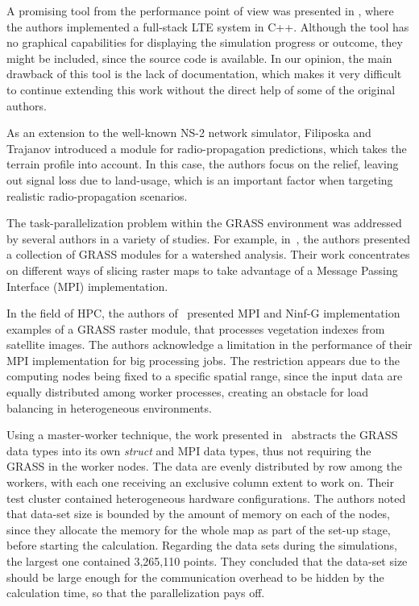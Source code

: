 A promising tool from the performance point of view was presented
in \cite{Piro_Simulating_LTE_cellular_systems_an_open_source_framework:2011},
where the authors implemented a full-stack LTE system in C++. Although
the tool has no graphical capabilities for displaying the simulation
progress or outcome, they might be included, since the source code
is available. In our opinion, the main drawback of this tool is the
lack of documentation, which makes it very difficult to continue extending
this work without the direct help of some of the original authors.

As an extension to the well-known NS-2 network simulator, Filiposka
and Trajanov \cite{Filiposka_Terrain_aware_three_dimensional_radio_propagation_model_extension_for_NS2:2011}
introduced a module for radio-propagation predictions, which takes
the terrain profile into account. In this case, the authors focus
on the relief, leaving out signal loss due to land-usage, which is
an important factor when targeting realistic radio-propagation scenarios.

\bigskip{}


The task-parallelization problem within the GRASS environment was
addressed by several authors in a variety of studies. For example,
in~\cite{Campos_Parallel_modelling_in_GIS:2012}, the authors presented
a collection of GRASS modules for a watershed analysis. Their work
concentrates on different ways of slicing raster maps to take advantage
of a Message Passing Interface (MPI) implementation.

In the field of HPC, the authors of~\cite{Akhter_Porting_GRASS_raster_module_to_distributed_computing:2007}
presented MPI and Ninf-G implementation examples of a GRASS raster
module, that processes vegetation indexes from satellite images. The
authors acknowledge a limitation in the performance of their MPI implementation
for big processing jobs. The restriction appears due to the computing
nodes being fixed to a specific spatial range, since the input data
are equally distributed among worker processes, creating an obstacle
for load balancing in heterogeneous environments.

Using a master-worker technique, the work presented in~\cite{Huang-Explorations_of_the_implementation_of_a_parallel_IDW_algorithm_in_a_Linux_cluster:2011}
abstracts the GRASS data types into its own \emph{struct} and MPI
data types, thus not requiring the GRASS in the worker nodes. The
data are evenly distributed by row among the workers, with each one
receiving an exclusive column extent to work on. Their test cluster
contained heterogeneous hardware configurations. The authors noted
that data-set size is bounded by the amount of memory on each of the
nodes, since they allocate the memory for the whole map as part of
the set-up stage, before starting the calculation. Regarding the data
sets during the simulations, the largest one contained 3,265,110 points.
They concluded that the data-set size should be large enough for the
communication overhead to be hidden by the calculation time, so that
the parallelization pays off.


